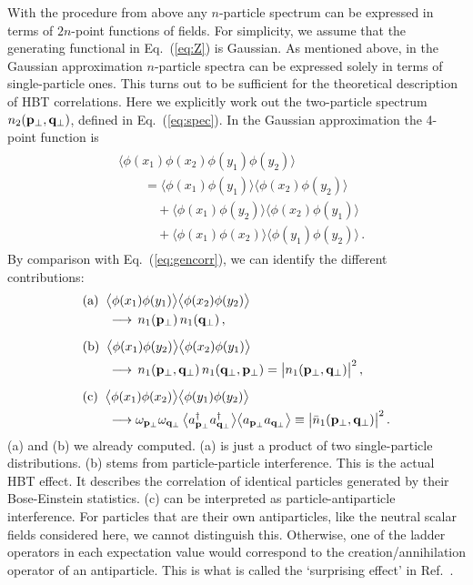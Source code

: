 \documentclass[reprint,superscriptaddress,english,preprintnumbers,amsmath,amssymb,aps,prx]{revtex4-2}
\def\Eq#1{Eq.~(\ref{#1})}
\begin{document}
With the procedure from above any $n$-particle spectrum can be expressed in terms of $2n$-point functions of fields. For simplicity, we assume that the generating functional in \Eq{eq:Z} is Gaussian. As mentioned above, in the Gaussian approximation $n$-particle spectra can be expressed solely in terms of single-particle ones. 
This turns out to be sufficient for the theoretical description of HBT correlations. 
Here we explicitly work out the two-particle spectrum $n_2(\bold{p}_\perp,\bold{q}_\perp)$, defined in \Eq{eq:spec}. In the Gaussian approximation the 4-point function is
\begin{align}
\begin{split}
&\big\langle \phi(x_1)\phi(x_2)\phi(y_1)\phi(y_2) \big\rangle\\
&\qquad=\big\langle \phi(x_1)\phi(y_1)\big\rangle  \big\langle \phi(x_2)\phi(y_2) \big\rangle\\  
&\qquad\quad+ \big\langle \phi(x_1)\phi(y_2) \big\rangle   \big\langle \phi(x_2)\phi(y_1)\big\rangle\\ 
&\qquad\quad+\big\langle \phi(x_1)\phi(x_2) \big\rangle  \big\langle \phi(y_1)\phi(y_2) \big\rangle\,. 
\end{split}
\end{align}
By comparison with \Eq{eq:gencorr}, we can identify the different contributions:
\begin{align}
\begin{split}
&{\rm (a)}\;\; \big\langle \phi(x_1)\phi(y_1) \big\rangle  \big\langle \phi(x_2)\phi(y_2) \big\rangle\\
&\qquad\longrightarrow \, n_1(\bold{p}_\perp)\,n_1(\bold{q}_\perp)\,,\\[5pt]
%
&{\rm (b)}\;\; \big\langle \phi(x_1)\phi(y_2) \big\rangle  \big\langle \phi(x_2)\phi(y_1) \big\rangle\\
 &\qquad\longrightarrow \, n_1(\bold{p}_\perp,\bold{q}_\perp)\,n_1(\bold{q}_\perp,\bold{p}_\perp)
  = \big|n_1(\bold{p}_\perp,\bold{q}_\perp)\big|^2\,,\\[5pt]
&{\rm (c)}\;\; \big\langle \phi(x_1)\phi(x_2) \big\rangle  \big\langle \phi(y_1)\phi(y_2) \big\rangle\\
 &\qquad\longrightarrow \omega_{\bold{p}_\perp}\omega_{\bold{q}_\perp}\,\big\langle a_{\bold{p}_\perp}^\dagger a_{\bold{q}_\perp}^\dagger \big\rangle  \big\langle a_{\bold{p}_\perp} a_{\bold{q}_\perp} \big\rangle
 \equiv \big|\bar n_1(\bold{p}_\perp,\bold{q}_\perp)\big|^2\,.
\end{split}
\end{align}
(a) and (b) we already computed. (a) is just a product of two single-particle distributions. (b) stems from particle-particle interference. This is the actual HBT effect. It describes the correlation of identical particles generated by their Bose-Einstein statistics. (c) can be interpreted as particle-antiparticle interference. For particles that are their own antiparticles, like the neutral scalar fields considered here, we cannot distinguish this. Otherwise, one of the ladder operators in each expectation value would correspond to the creation/annihilation operator of an antiparticle.
This is what is called the `surprising effect' in Ref.\ \cite{Weiner:1999th}.
\end{document}
